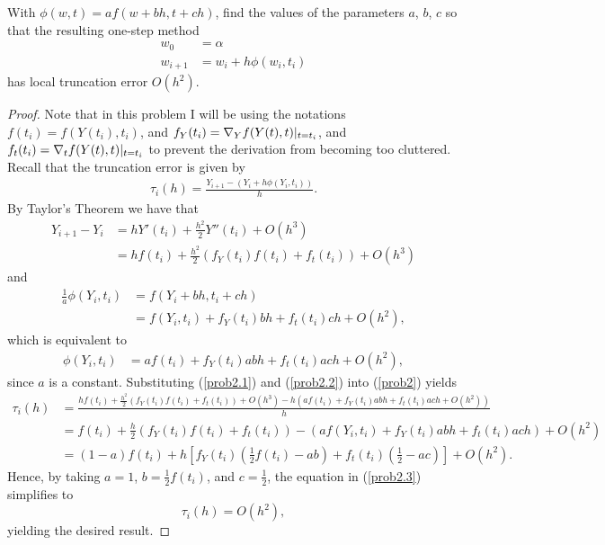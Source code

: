 \documentclass[8pt]{article}
\theoremstyle{definition}
\newenvironment{exercise}[1]
  {\renewcommand\theinnerexercise{#1}\innerexercise}
  {\endinnerexercise}
\begin{document}
\newpage

\begin{exercise}{2}
With $\phi(w, t) = a f(w + bh, t + ch)$, find the values of the parameters $a$, $b$, $c$ so that the resulting one-step method 
\begin{align*}
w_0 &= \alpha \\
w_{i+1} &= w_i + h \phi(w_i, t_i)
\end{align*}
has local truncation error $O(h^2)$.
\end{exercise}

\begin{proof}
Note that in this problem I will be using the notations $f (t_i) = f(Y(t_i), t_i)$, and $f_Y (t_i) = \nabla_Y f(Y(t), t) \arrowvert_{t = t_i}$, and $f_t (t_i) = \nabla_t f(Y(t), t) \arrowvert_{t = t_i}$ to prevent the derivation from becoming too cluttered. Recall that the truncation error is given by 
\begin{align}
\tau_i (h) = \frac{Y_{i+1} - \left( Y_i + h \phi(Y_i, t_i) \right)}{h}. \label{prob2}
\end{align}
By Taylor's Theorem we have that 
\begin{align}
Y_{i+1} - Y_i &= h Y'(t_i) + \frac{h^2}{2} Y''(t_i) + O(h^3) \nonumber \\
&= h f(t_i) + \frac{h^2}{2} \left( f_Y (t_i) f (t_i) + f_t (t_i) \right) + O(h^3) \label{prob2.1}
\end{align}
and 
\begin{align}
\frac{1}{a} \phi (Y_i, t_i) &= f(Y_i + bh, t_i + ch) \nonumber \\
&= f(Y_i, t_i) + f_Y (t_i) bh + f_t (t_i) ch + O(h^2), \nonumber
\end{align}
which is equivalent to 
\begin{align}
\phi (Y_i, t_i) &= a f(t_i) + f_Y (t_i) abh + f_t (t_i) ach + O(h^2), \label{prob2.2}
\end{align}
since $a$ is a constant. Substituting (\ref{prob2.1}) and (\ref{prob2.2}) into (\ref{prob2}) yields
\begin{align}
\tau_i (h) &= \frac{h f(t_i) + \frac{h^2}{2} \left( f_Y (t_i) f (t_i) + f_t (t_i) \right) + O(h^3) - h \left( a f(t_i) + f_Y (t_i) abh + f_t (t_i) ach + O(h^2) \right)}{h} \nonumber \\
&= f(t_i) + \frac{h}{2} \left( f_Y (t_i) f (t_i) + f_t (t_i) \right) - \left( a f(Y_i, t_i) + f_Y (t_i) abh + f_t (t_i) ach \right) + O(h^2) \nonumber \\
&= (1-a) f(t_i) + h \left[ f_Y (t_i) \left( \frac{1}{2} f (t_i) - ab \right) + f_t (t_i) \left( \frac{1}{2} - ac \right) \right] + O(h^2). \label{prob2.3}
\end{align}
Hence, by taking $a = 1$, $b = \frac{1}{2} f(t_i)$, and $c = \frac{1}{2}$, the equation in (\ref{prob2.3}) simplifies to $$\tau_{i} (h) = O(h^2),$$ yielding the desired result.
\end{proof}
\end{document}
